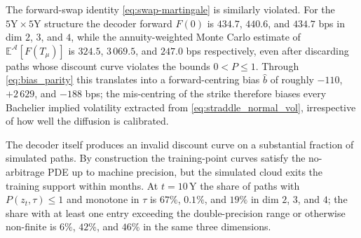 The forward-swap identity \eqref{eq:swap-martingale} is similarly violated. For the $5\text{Y}\times 5\text{Y}$ structure the decoder forward $F(0)$ is $434.7$, $440.6$, and $434.7$ bps in dim $2$, $3$, and $4$, while the annuity-weighted Monte Carlo estimate of $\mathbb E^{\mathcal A}[F(T_\mu)]$ is $324.5$, $3\,069.5$, and $247.0$ bps respectively, even after discarding paths whose discount curve violates the bounds \(0<P\le1\). Through \eqref{eq:bias_parity} this translates into a forward-centring bias $\widehat b$ of roughly $-110$, $+2\,629$, and $-188$ bps; the mis-centring of the strike therefore biases every Bachelier implied volatility extracted from \eqref{eq:straddle_normal_vol}, irrespective of how well the diffusion is calibrated.

The decoder itself produces an invalid discount curve on a substantial fraction of simulated paths. By construction the training-point curves satisfy the no-arbitrage PDE up to machine precision, but the simulated cloud exits the training support within months. At $t=10$\,Y the share of paths with \(P(z_t,\tau)\le1\) and monotone in $\tau$ is $67\%$, $0.1\%$, and $19\%$ in dim $2$, $3$, and $4$; the share with at least one entry exceeding the double-precision range or otherwise non-finite is $6\%$, $42\%$, and $46\%$ in the same three dimensions.

